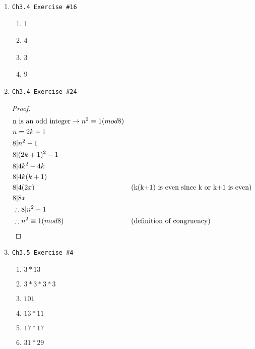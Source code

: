 \documentclass[12pt]{article}
\begin{document}
\begin{enumerate}
    \newpage

    \item \begin{verbatim}Ch3.4 Exercise #16\end{verbatim}
        \begin{enumerate}[label=\alph*]
            \item 1
            \item 4
            \item 3
            \item 9
        \end{enumerate}

    \item \begin{verbatim}Ch3.4 Exercise #24\end{verbatim}
        \begin{proof}
            \begin{align*}
                & \text{n is an odd integer} \rightarrow n^2 \equiv 1(mod 8) \\
                & n = 2k + 1 \\
                & 8 | n^2 - 1 \\
                & 8 | (2k + 1)^2 - 1 \\
                & 8 | 4k^2 + 4k \\
                & 8 | 4k(k + 1) \\
                & 8 | 4(2x)   && \text{(k(k+1) is even since k or k+1 is even)} \\
                & 8 | 8x \\
                & \therefore 8 | n^2 - 1 \\
                & \therefore n^2 \equiv 1(mod 8) && \text{(definition of congruency)} \qedhere 
            \end{align*}
        \end{proof}

    \item \begin{verbatim}Ch3.5 Exercise #4\end{verbatim}
        \begin{enumerate}[label=\alph*]
            \item $ 3 * 13 $ 
            \item $ 3 * 3 * 3 * 3 $
            \item $ 101 $
            \item $ 13 * 11 $
            \item $ 17 * 17 $
            \item $ 31 * 29 $


\end{enumerate}
\end{enumerate}
\end{document}
